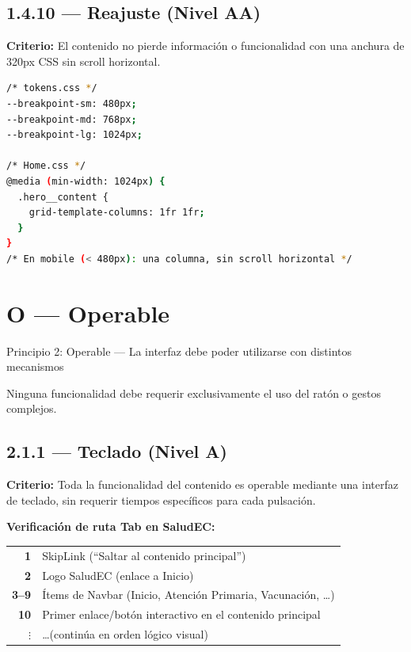 \documentclass[12pt, a4paper]{article}
\begin{document}
\subsection{1.4.10 --- Reajuste (Nivel AA)}

\textbf{Criterio:} El contenido no pierde información o funcionalidad con una anchura de 320px CSS sin scroll horizontal.

\begin{evidbox}
\begin{lstlisting}[language=bash]
/* tokens.css */
--breakpoint-sm: 480px;
--breakpoint-md: 768px;
--breakpoint-lg: 1024px;

/* Home.css */
@media (min-width: 1024px) {
  .hero__content {
    grid-template-columns: 1fr 1fr;
  }
}
/* En mobile (< 480px): una columna, sin scroll horizontal */
\end{lstlisting}
\end{evidbox}

\section{O --- Operable}

\begin{princbox}[successgreen]{Principio 2: Operable --- La interfaz debe poder utilizarse con distintos mecanismos}

Ninguna funcionalidad debe requerir exclusivamente el uso del ratón o gestos complejos.
\end{princbox}

\subsection{2.1.1 --- Teclado (Nivel A)}

\textbf{Criterio:} Toda la funcionalidad del contenido es operable mediante una interfaz de teclado, sin requerir tiempos específicos para cada pulsación.

\textbf{Verificación de ruta Tab en SaludEC:}

\begin{center}
\begin{tabular}{>{\bfseries\small}r l}
1 & SkipLink (``Saltar al contenido principal'') \\
2 & Logo SaludEC (enlace a Inicio) \\
3--9 & Ítems de Navbar (Inicio, Atención Primaria, Vacunación, \ldots) \\
10 & Primer enlace/botón interactivo en el contenido principal \\
$\vdots$ & \ldots (continúa en orden lógico visual) \\
\end{tabular}
\end{center}
\end{document}
